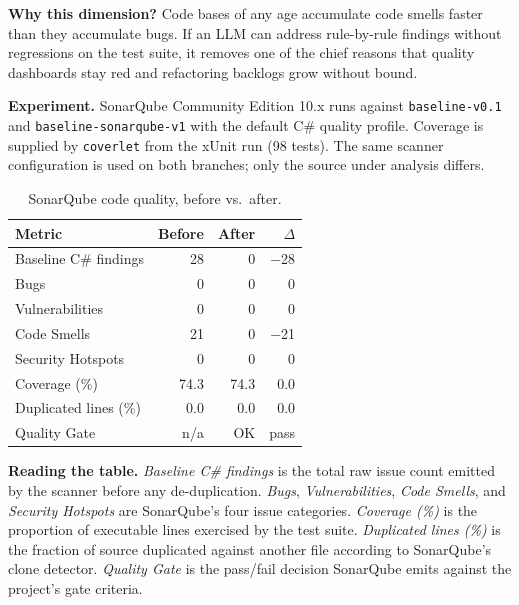 \documentclass[conference]{IEEEtran}
\begin{document}
\textbf{Why this dimension?} Code bases of any age accumulate code smells faster than they accumulate bugs. If an LLM can address rule-by-rule findings without regressions on the test suite, it removes one of the chief reasons that quality dashboards stay red and refactoring backlogs grow without bound.

\textbf{Experiment.} SonarQube Community Edition 10.x runs against \texttt{baseline-v0.1} and \texttt{baseline-sonarqube-v1} with the default C\# quality profile. Coverage is supplied by \texttt{coverlet} from the xUnit run (98 tests). The same scanner configuration is used on both branches; only the source under analysis differs.

\begin{table}[t]
\caption{SonarQube code quality, before vs.\ after.}
\label{tab:sonar}
\centering
\begin{tabular}{lrrr}
\toprule
Metric & Before & After & $\Delta$ \\
\midrule
Baseline C\# findings & 28 & 0 & $-$28 \\
Bugs & 0 & 0 & 0 \\
Vulnerabilities & 0 & 0 & 0 \\
Code Smells & 21 & 0 & $-$21 \\
Security Hotspots & 0 & 0 & 0 \\
Coverage (\%) & 74.3 & 74.3 & 0.0 \\
Duplicated lines (\%) & 0.0 & 0.0 & 0.0 \\
Quality Gate & n/a\footnotemark[1] & OK & pass \\
\bottomrule
\end{tabular}
\end{table}

\textbf{Reading the table.} \emph{Baseline C\# findings} is the total raw issue count emitted by the scanner before any de-duplication. \emph{Bugs}, \emph{Vulnerabilities}, \emph{Code Smells}, and \emph{Security Hotspots} are SonarQube's four issue categories. \emph{Coverage (\%)} is the proportion of executable lines exercised by the test suite. \emph{Duplicated lines (\%)} is the fraction of source duplicated against another file according to SonarQube's clone detector. \emph{Quality Gate} is the pass/fail decision SonarQube emits against the project's gate criteria.
\end{document}
